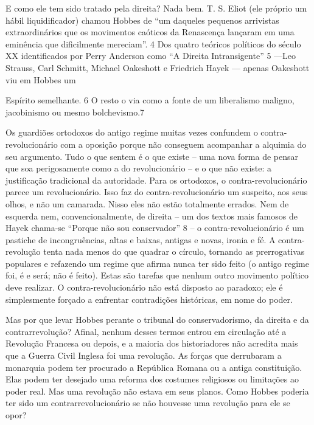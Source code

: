  \par 
E como ele tem sido tratado pela direita? Nada bem. T. S. Eliot (ele próprio um hábil liquidificador) chamou Hobbes de “um daqueles pequenos arrivistas extraordinários que os movimentos caóticos da Renascença lançaram em uma eminência que dificilmente mereciam”. {\color{blue}4} Dos quatro teóricos políticos do século XX identificados por Perry Anderson como “A Direita Intransigente” {\color{blue}5} —Leo Strauss, Carl Schmitt, Michael Oakeshott e Friedrich Hayek — apenas Oakeshott viu em Hobbes um
 \par 
Espírito semelhante. {\color{blue}6} O resto o via como a fonte de um liberalismo maligno, jacobinismo ou mesmo bolchevismo.{\color{blue}7}
 \par 
Os guardiões ortodoxos do antigo regime muitas vezes confundem o contra-revolucionário com a oposição porque não conseguem acompanhar a alquimia do seu argumento. Tudo o que sentem é o que existe – uma nova forma de pensar que soa perigosamente como a do revolucionário – e o que não existe: a justificação tradicional da autoridade. Para os ortodoxos, o contra-revolucionário parece um revolucionário. Isso faz do contra-revolucionário um suspeito, aos seus olhos, e não um camarada. Nisso eles não estão totalmente errados. Nem de esquerda nem, convencionalmente, de direita – um dos textos mais famosos de Hayek chama-se “Porque não sou conservador” {\color{blue}8} – o contra-revolucionário é um pastiche de incongruências, altas e baixas, antigas e novas, ironia e fé. A contra-revolução tenta nada menos do que quadrar o círculo, tornando as prerrogativas populares e refazendo um regime que afirma nunca ter sido feito (o antigo regime foi, é e será; não é feito). Estas são tarefas que nenhum outro movimento político deve realizar. O contra-revolucionário não está disposto ao paradoxo; ele é simplesmente forçado a enfrentar contradições históricas, em nome do poder.
 \par 
Mas por que levar Hobbes perante o tribunal do conservadorismo, da direita e da contrarrevolução? Afinal, nenhum desses termos entrou em circulação até a Revolução Francesa ou depois, e a maioria dos historiadores não acredita mais que a Guerra Civil Inglesa foi uma revolução. As forças que derrubaram a monarquia podem ter procurado a República Romana ou a antiga constituição. Elas podem ter desejado uma reforma dos costumes religiosos ou limitações ao poder real. Mas uma revolução não estava em seus planos. Como Hobbes poderia ter sido um contrarrevolucionário se não houvesse uma revolução para ele se opor?
